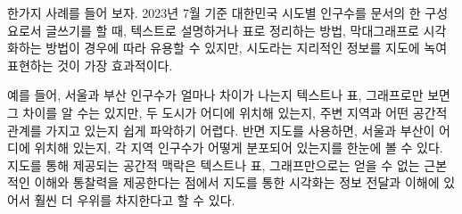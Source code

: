 \documentclass[
  letterpaper,
]{book}
\begin{document}
한가지 사례를 들어 보자. 2023년 7월 기준 대한민국 시도별 인구수를 문서의
한 구성요로서 글쓰기를 할 때, 텍스트로 설명하거나 표로 정리하는 방법,
막대그래프로 시각화하는 방법이 경우에 따라 유용할 수 있지만, 시도라는
지리적인 정보를 지도에 녹여 표현하는 것이 가장 효과적이다.

예를 들어, 서울과 부산 인구수가 얼마나 차이가 나는지 텍스트나 표,
그래프로만 보면 그 차이를 알 수는 있지만, 두 도시가 어디에 위치해
있는지, 주변 지역과 어떤 공간적 관계를 가지고 있는지 쉽게 파악하기
어렵다. 반면 지도를 사용하면, 서울과 부산이 어디에 위치해 있는지, 각
지역 인구수가 어떻게 분포되어 있는지를 한눈에 볼 수 있다. 지도를 통해
제공되는 공간적 맥락은 텍스트나 표, 그래프만으로는 얻을 수 없는 근본적인
이해와 통찰력을 제공한다는 점에서 지도를 통한 시각화는 정보 전달과
이해에 있어서 훨씬 더 우위를 차지한다고 할 수 있다.
\end{document}

